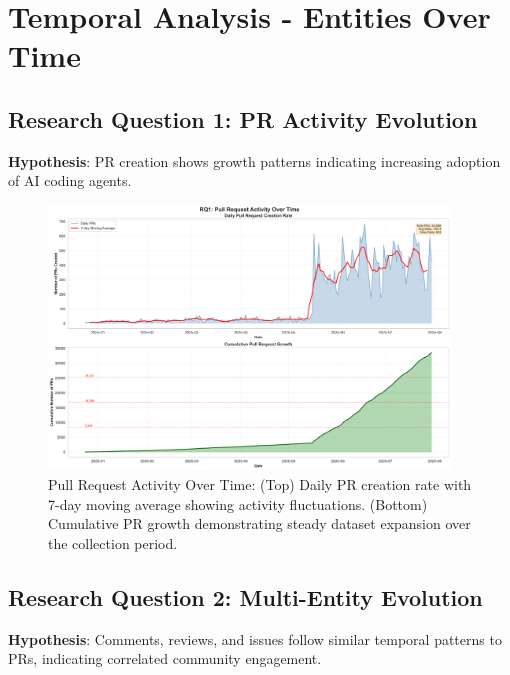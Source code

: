 \documentclass[11pt]{article}
\begin{document}
\section{Temporal Analysis - Entities Over Time}

\subsection{Research Question 1: PR Activity Evolution}

\textbf{Hypothesis}: PR creation shows growth patterns indicating increasing adoption of AI coding agents.

\begin{figure}[H]
\centering
\includegraphics[width=0.95\textwidth]{figures/temporal_01_pr_growth.png}
\caption{Pull Request Activity Over Time: (Top) Daily PR creation rate with 7-day moving average showing activity fluctuations. (Bottom) Cumulative PR growth demonstrating steady dataset expansion over the collection period.}
\label{fig:temporal_pr}
\end{figure}

\subsection{Research Question 2: Multi-Entity Evolution}

\textbf{Hypothesis}: Comments, reviews, and issues follow similar temporal patterns to PRs, indicating correlated community engagement.
\end{document}
